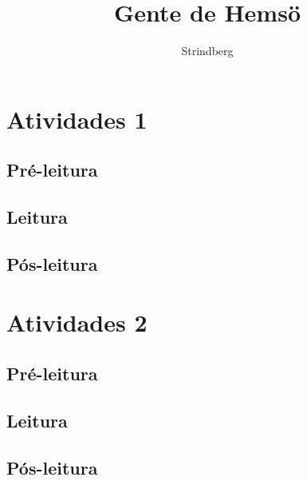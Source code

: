\documentclass{article}
\begin{document}
\newcommand{\AutorLivro}{Strindberg}
\newcommand{\TituloLivro}{Gente de Hemsö}
\newcommand{\Tema}{Ficção, mistério e fantasia}
\newcommand{\Genero}{Romance}
\newcommand{\imagemCapa}{PNLD0039-01.png}
\newcommand{\issnppub}{---}
\newcommand{\issnepub}{---}
\newcommand{\colaborador}{\textbf{Fulano de Tal} é uma pessoa incrível e vai fazer um bom serviço.}


\title{\TituloLivro}
\author{\AutorLivro}
\def\authornotes{\colaborador}

\date{}
\maketitle
\tableofcontents




\section{Atividades 1}


\subsection{Pré-leitura}
\subsection{Leitura}
\subsection{Pós-leitura}



\section{Atividades 2}

\subsection{Pré-leitura}
\subsection{Leitura}
\subsection{Pós-leitura}

\lipsum
\end{document}
